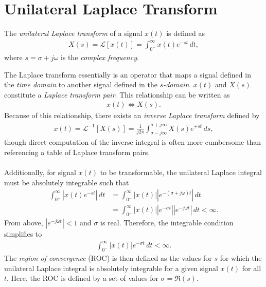 \documentclass{report}
\begin{document}
\section{Unilateral Laplace Transform}
\begin{tcolorbox}[width=\textwidth,colback={white}, sharp corners]
    The \emph{unilateral Laplace transform} of a signal $x(t)$ is defined as  
    \begin{align}
        X(s) = \mathcal{L}[x(t)] = \int_{0^-}^{\infty} x(t) e^{-st} \,dt,
    \end{align}
    where $s=\sigma + j\omega$ is the \emph{complex frequency}. 
\end{tcolorbox}
\noindent The Laplace transform essentially is an operator that maps a signal defined in the \emph{time domain} to another signal 
defined in the \emph{$s$-domain}. $x(t)$ and $X(s)$ constitute a \emph{Laplace transform pair}. This relationship can be written as 
\begin{align}
    x(t) \iff X(s).
\end{align}
Because of this relationship, there exists an \emph{inverse Laplace transform} defined by 
\begin{align}
    x(t) = \mathcal{L}^{-1}[X(s)] = \frac{1}{j2\pi}\int_{\sigma-j\infty}^{\sigma+j\infty} X(s) e^{+st} \,ds,
\end{align}
though direct computation of the inverse integral is often more cumbersome than referencing a table of Laplace transform pairs.
\\ \\
Additionally, for signal $x(t)$ to be transformable, the unilateral Laplace integral must be absolutely integrable such that 
\begin{align}
    \int_{0^-}^{\infty} |x(t) e^{-st}| \,dt &= \int_{0^-}^{\infty} |x(t)||e^{-(\sigma+j\omega)t}| \,dt \nonumber \\
    &= \int_{0^-}^{\infty} |x(t)| |e^{-\sigma t}| |e^{-j\omega t}| \,dt < \infty. 
\end{align}
From above, $|e^{-j\omega t}|<1$ and $\sigma$ is real. Therefore, the integrable condition simplifies to 
\begin{align}
    \int_{0^-}^{\infty} |x(t)| e^{-\sigma t} \,dt < \infty.
\end{align}
The \emph{region of convergence} (ROC) is then defined as the values for $s$ for which the unilateral Laplace integral is absolutely integrable 
for a given signal $x(t)$ for all $t$. Here, the ROC is defined by a set of values for $\sigma = \Re(s)$.
\\ \\
\end{document}
